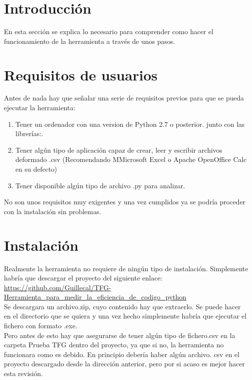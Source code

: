 
\section{Introducción}
En esta sección se explica lo necesario para comprender como hacer el funcionamiento de la herramienta a través de unos pasos.
\section{Requisitos de usuarios}
Antes de nada hay que señalar una serie de requisitos previos para que se pueda ejecutar la herramienta:

\begin{enumerate}
	\item Tener un ordenador con una version de Python 2.7 o posterior. junto con las librerías:.
	\item Tener algún tipo de aplicación capaz de crear, leer y escribir archivos deformado .csv (Recomendando MMicrosoft Excel o Apache OpenOffice Calc en su defecto)
	\item Tener disponible algún tipo de  archivo .py para analizar.
\end{enumerate}


No son unos requisitos muy exigentes y una vez cumplidos ya se podría proceder con la instalación sin problemas.

\section{Instalación}
Realmente la herramienta no requiere de ningún tipo de instalación. Simplemente habría que descargar el proyecto del siguiente enlace:\\

\url{https://github.com/Guillecal/TFG-Herramienta_para_medir_la_eficiencia_de_codigo_python}\\

Se descargara un archivo.zip, cuyo contenido hay que extraerlo. Se puede hacer en el directorio que se quiera y una vez hecho simplemente habría que ejecutar el fichero con formato .exe.\\

Pero antes de esto hay que asegurarse de tener algún tipo de fichero.csv en la carpeta Prueba TFG dentro del proyecto, ya que si no, la  herramienta no funcionara como es debido. En principio debería haber algún archivo. csv en el proyecto descargado desde la dirección anterior, pero por si acaso es mejor hacer esta revisión.

